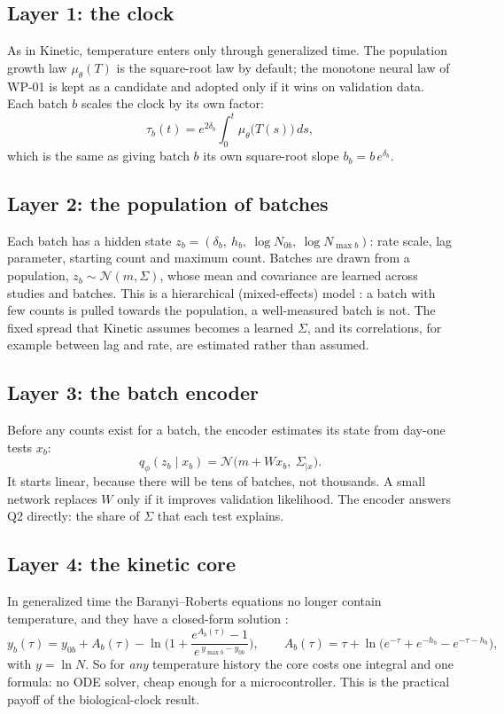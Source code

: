 \subsection{Layer 1: the clock}
As in Kinetic, temperature enters only through generalized time. The population growth law $\mu_\theta(T)$ is the square-root law by default; the monotone neural law of WP-01 is kept as a candidate and adopted only if it wins on validation data. Each batch $b$ scales the clock by its own factor:
\[\tau_b(t)=e^{2\delta_b}\int_0^t\mu_\theta\big(T(s)\big)\,ds,\]
which is the same as giving batch $b$ its own square-root slope $b_b=b\,e^{\delta_b}$.

\subsection{Layer 2: the population of batches}
Each batch has a hidden state $z_b=(\delta_b,\ h_b,\ \log N_{0b},\ \log N_{\max b})$: rate scale, lag parameter, starting count and maximum count. Batches are drawn from a population, $z_b\sim\mathcal N(m,\Sigma)$, whose mean and covariance are learned across studies and batches. This is a hierarchical (mixed-effects) model \cite{gelman2007}: a batch with few counts is pulled towards the population, a well-measured batch is not. The fixed spread that Kinetic assumes becomes a learned $\Sigma$, and its correlations, for example between lag and rate, are estimated rather than assumed.

\subsection{Layer 3: the batch encoder}
Before any counts exist for a batch, the encoder estimates its state from day-one tests $x_b$:
\[q_\phi(z_b\mid x_b)=\mathcal N\big(m+W x_b,\ \Sigma_{\mid x}\big).\]
It starts linear, because there will be tens of batches, not thousands. A small network replaces $W$ only if it improves validation likelihood. The encoder answers Q2 directly: the share of $\Sigma$ that each test explains.

\subsection{Layer 4: the kinetic core}
In generalized time the Baranyi--Roberts equations no longer contain temperature, and they have a closed-form solution \cite{baranyi1993,baranyi1994}:
\[y_b(\tau)=y_{0b}+A_b(\tau)-\ln\!\Big(1+\frac{e^{A_b(\tau)}-1}{e^{\,y_{\max b}-y_{0b}}}\Big),\qquad A_b(\tau)=\tau+\ln\!\big(e^{-\tau}+e^{-h_b}-e^{-\tau-h_b}\big),\]
with $y=\ln N$. So for \emph{any} temperature history the core costs one integral and one formula: no ODE solver, cheap enough for a microcontroller. This is the practical payoff of the biological-clock result.

